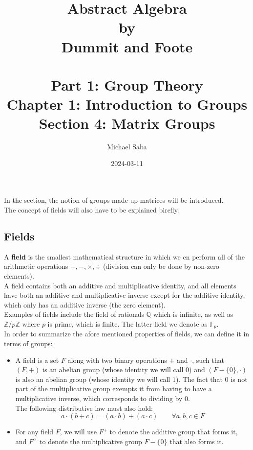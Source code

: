 \documentclass[12pt]{article}
\title{%
    \Huge Abstract Algebra \\
    \large by \\
    \Large Dummit and Foote \\~\\
    \huge Part 1: Group Theory \\
    \LARGE Chapter 1: Introduction to Groups \\
    \Large Section 4: Matrix Groups
}
\date{2024-03-11}
\author{Michael Saba}
\newcommand{\Z}{\mathbb{Z}}
\newcommand{\Q}{\mathbb{Q}}
\begin{document}
    \maketitle
    \newpage


    In the section, the notion of groups made up matrices
    will be introduced. \\
    The concept of fields will also have to be explained birefly. \\

    \subsection*{Fields}

    A \textbf{field} is the smallest mathematical structure
    in which we cn perform
    all of the arithmetic operations $+, -, \times, \div$ 
    (division can only be done by non-zero elements). \\
    A field contains both an additive and multiplicative identity,
    and all elements have both an additive and multiplicative inverse
    except for the additive identity,
    which only has an additive inverse
    (the zero element). \\
    Examples of fields include the field of rationals $\Q$
    which is infinite,
    as well as $\Z/p\Z$ where $p$ is prime,
    which is finite.
    The latter field we denote as $\mathbb{F}_p$. \\

    In order to summarize the afore mentioned properties of fields,
    we can define it in terms of groups:
    \begin{itemize}[label=$\diamond$]
        \item 
            A field is a set $F$
            along with two binary operations $+$ and $\cdot$,
            such that $(F, +)$ is an abelian group
            (whose identity we will call $0$)
            and $(F - \{0\}, \cdot)$ is also an abelian group
            (whose identity we will call $1$).
            The fact that $0$ is not part of the multiplicative group
            exempts it from having to have a multiplicative inverse,
            which corresponds to dividing by $0$. \\
            The following distributive law must also hold: 
            \[ a \cdot (b + c) = (a \cdot b) + (a \cdot c)
            \qquad \forall a, b, c \in F \]
        \item 
            For any field $F$,
            we will use $F^+$ to denote the additive group that forms it,
            and $F^\times$ to denote the multiplicative group $F - \{0\}$
            that also forms it.
    \end{itemize}
\end{document}
